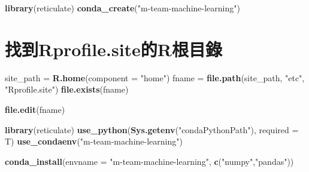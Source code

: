 \documentclass[]{book}
\newenvironment{Shaded}{\begin{snugshade}}{\end{snugshade}}
\newcommand{\KeywordTok}[1]{\textcolor[rgb]{0.13,0.29,0.53}{\textbf{#1}}}
\newcommand{\DataTypeTok}[1]{\textcolor[rgb]{0.13,0.29,0.53}{#1}}
\newcommand{\StringTok}[1]{\textcolor[rgb]{0.31,0.60,0.02}{#1}}
\newcommand{\NormalTok}[1]{#1}
\begin{document}
\begin{Shaded}
\begin{Highlighting}[]
\KeywordTok{library}\NormalTok{(reticulate)}
\KeywordTok{conda_create}\NormalTok{(}\StringTok{"m-team-machine-learning"}\NormalTok{)}
\end{Highlighting}
\end{Shaded}

\hypertarget{rprofile.siter-1}{%
\section{找到Rprofile.site的R根目錄}\label{rprofile.siter-1}}

\begin{Shaded}
\begin{Highlighting}[]
\NormalTok{site_path =}\StringTok{ }\KeywordTok{R.home}\NormalTok{(}\DataTypeTok{component =} \StringTok{"home"}\NormalTok{)}
\NormalTok{fname =}\StringTok{ }\KeywordTok{file.path}\NormalTok{(site_path, }\StringTok{"etc"}\NormalTok{, }\StringTok{"Rprofile.site"}\NormalTok{)}
\KeywordTok{file.exists}\NormalTok{(fname)}
\end{Highlighting}
\end{Shaded}

\begin{Shaded}
\begin{Highlighting}[]
\KeywordTok{file.edit}\NormalTok{(fname)}
\end{Highlighting}
\end{Shaded}

\begin{Shaded}
\begin{Highlighting}[]
\KeywordTok{library}\NormalTok{(reticulate)}
\KeywordTok{use_python}\NormalTok{(}\KeywordTok{Sys.getenv}\NormalTok{(}\StringTok{"condaPythonPath"}\NormalTok{),}
           \DataTypeTok{required =}\NormalTok{ T)}
\KeywordTok{use_condaenv}\NormalTok{(}\StringTok{"m-team-machine-learning"}\NormalTok{)}
\end{Highlighting}
\end{Shaded}

\begin{Shaded}
\begin{Highlighting}[]
\KeywordTok{conda_install}\NormalTok{(}\DataTypeTok{envname =} \StringTok{"m-team-machine-learning"}\NormalTok{,}
              \KeywordTok{c}\NormalTok{(}\StringTok{"numpy"}\NormalTok{,}\StringTok{"pandas"}\NormalTok{))}
\end{Highlighting}
\end{Shaded}
\end{document}

